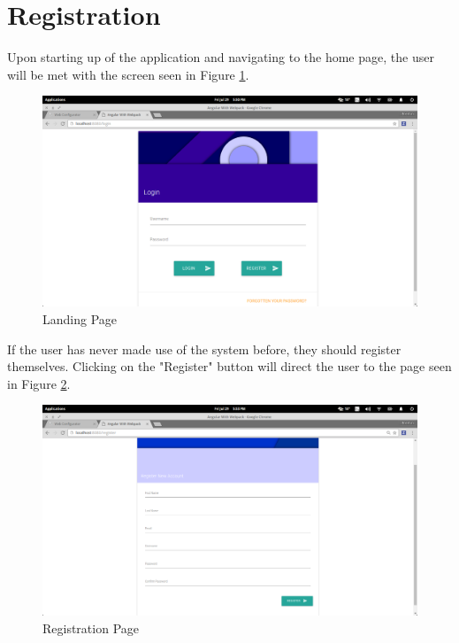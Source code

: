 \documentclass[11pt,a4paper]{article}
\begin{document}
\section{Registration}
Upon starting up of the application and navigating to the home page, the user will be met with the screen seen in 
Figure \ref{fig:landPage}.
\begin{figure}[H]
	\begin{center}
		\includegraphics[scale=0.3]{../Images/User Manual/Landing Page.png}
		\caption{Landing Page}
		\label{fig:landPage}
	\end{center}  
\end{figure}

If the user has never made use of the system before, they should register themselves. Clicking on the "Register"
button will direct the user to the page seen in Figure \ref{fig:regPage}.
\begin{figure}[H]
	\begin{center}
		\includegraphics[scale=0.3]{../Images/User Manual/Registration Page.png}
		\caption{Registration Page}
		\label{fig:regPage}
	\end{center}  
\end{figure}
\end{document}
